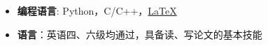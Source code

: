   \begin{itemize}[leftmargin=*]
    \item \textbf{编程语言}: Python，C/C++，\href{https://www.latex-project.org/}{\LaTeX}
    \item \textbf{语言}：英语四、六级均通过，具备读、写论文的基本技能
  \end{itemize}